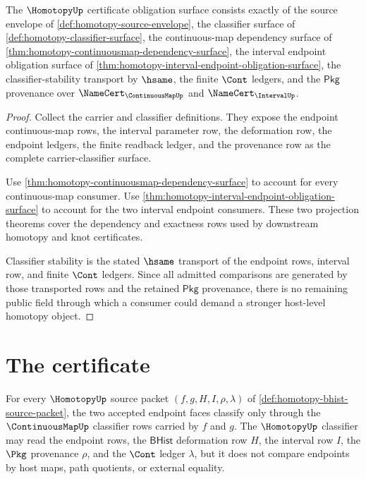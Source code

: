 \begin{theorem}
\label{thm:homotopy-certificate-obligation-surface}
The $\HomotopyUp$ certificate obligation surface consists exactly of the source envelope of \autoref{def:homotopy-source-envelope}, the classifier surface of \autoref{def:homotopy-classifier-surface}, the continuous-map dependency surface of \autoref{thm:homotopy-continuousmap-dependency-surface}, the interval endpoint obligation surface of \autoref{thm:homotopy-interval-endpoint-obligation-surface}, the classifier-stability transport by $\hsame$, the finite $\Cont$ ledgers, and the $\mathsf{Pkg}$ provenance over $\NameCert_{\ContinuousMapUp}$ and $\NameCert_{\IntervalUp}$.
\end{theorem}
\begin{proof}
Collect the carrier and classifier definitions. They expose the endpoint continuous-map rows, the interval parameter row, the deformation row, the endpoint ledgers, the finite readback ledger, and the provenance row as the complete carrier-classifier surface.

Use \autoref{thm:homotopy-continuousmap-dependency-surface} to account for every continuous-map consumer. Use \autoref{thm:homotopy-interval-endpoint-obligation-surface} to account for the two interval endpoint consumers. These two projection theorems cover the dependency and exactness rows used by downstream homotopy and knot certificates.

Classifier stability is the stated $\hsame$ transport of the endpoint rows, interval row, and finite $\Cont$ ledgers. Since all admitted comparisons are generated by those transported rows and the retained $\mathsf{Pkg}$ provenance, there is no remaining public field through which a consumer could demand a stronger host-level homotopy object.
\end{proof}

\section{The certificate}
\label{sec:homotopy-certificate}

\begin{theorem}
\label{thm:homotopy-endpoint-classifier-row}
For every $\HomotopyUp$ source packet $(f,g,H,I,\rho,\lambda)$ of
\autoref{def:homotopy-bhist-source-packet}, the two accepted endpoint faces
classify only through the $\ContinuousMapUp$ classifier rows carried by $f$
and $g$. The $\HomotopyUp$ classifier may read the endpoint rows, the
$\mathsf{BHist}$ deformation row $H$, the interval row $I$, the $\Pkg$
provenance $\rho$, and the $\Cont$ ledger $\lambda$, but it does not compare
endpoints by host maps, path quotients, or external equality.
\end{theorem}

